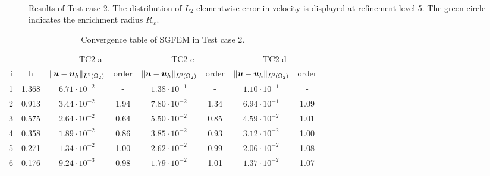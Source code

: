 %

\begin{figure}[!htb]
    \centering
     \\
    \caption
    {Results of Test case 2. The distribution of $L_2$ elementwise error in velocity is displayed at refinement level 5.
    The green circle indicates the enrichment radius $R_w$. }
    \label{fig:mh_tc2_error}
\end{figure}
%

\begin{table}[!htb]
\begin{center}
\bgroup
\def\arraystretch{1.2}
\setlength\tabcolsep{5pt}
\begin{tabular}{rc|cc|cc|cc}
\toprule
\multicolumn{2}{c|}{} & \multicolumn{2}{c|}{ TC2-a } & \multicolumn{2}{c|}{ TC2-c } & \multicolumn{2}{c}{TC2-d}\\ [3pt] %
i & h & $\|\mathbf{\boldsymbol{u}}-\mathbf{\boldsymbol{u}}_h\|_{L^2(\Omega_2)}$ & order & $\|\mathbf{\boldsymbol{u}}-\mathbf{\boldsymbol{u}}_h\|_{L^2(\Omega_2)}$
    & order & $\|\mathbf{\boldsymbol{u}}-\mathbf{\boldsymbol{u}}_h\|_{L^2(\Omega_2)}$ & order \\ [3pt] \midrule
1 & 1.368 &  $6.71\cdot10^{-2}$  &  -   &  $1.38\cdot10^{-1}$  &  -   &  $1.10\cdot10^{-1}$ &   -   \\
2 & 0.913 &  $3.44\cdot10^{-2}$  & 1.94 &  $7.80\cdot10^{-2}$  & 1.34 &  $6.94\cdot10^{-1}$ &  1.09 \\
3 & 0.575 &  $2.64\cdot10^{-2}$  & 0.64 &  $5.50\cdot10^{-2}$  & 0.85 &  $4.59\cdot10^{-2}$ &  1.01 \\
4 & 0.358 &  $1.89\cdot10^{-2}$  & 0.86 &  $3.85\cdot10^{-2}$  & 0.93 &  $3.12\cdot10^{-2}$ &  1.00 \\
5 & 0.271 &  $1.34\cdot10^{-2}$  & 1.00 &  $2.62\cdot10^{-2}$  & 0.99 &  $2.06\cdot10^{-2}$ &  1.08 \\
6 & 0.176 &  $9.24\cdot10^{-3}$  & 0.98 &  $1.79\cdot10^{-2}$  & 1.01 &  $1.37\cdot10^{-2}$ &  1.07 \\
\bottomrule
\end{tabular}
\caption{Convergence table of SGFEM in Test case 2.}
\label{tab:mh_tc2_convergence}
\egroup
\end{center}
\end{table}

